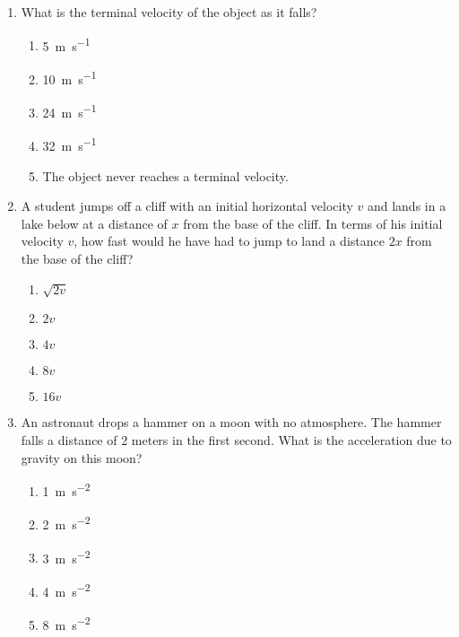 \documentclass{../../oss-apphys}
\begin{document}
\begin{multicols}{2}
\begin{enumerate}[resume,leftmargin=18pt]
  \item What is the terminal velocity of the object as it falls?
    \begin{enumerate}[noitemsep,topsep=0pt,leftmargin=18pt,label=(\Alph*)]
    \item \SI{5 }{\metre\per\second}
    \item \SI{10}{\metre\per\second}
    \item \SI{24}{\metre\per\second}
    \item \SI{32}{\metre\per\second}
    \item The object never reaches a terminal velocity.
    \end{enumerate}
  
  \item A student jumps off a cliff with an initial horizontal velocity $v$ and
    lands in a lake below at a distance of $x$ from the base of the cliff. In
    terms of his initial velocity $v$, how fast would he have had to jump to
    land a distance $2x$ from the base of the cliff?
    \begin{center}
    \end{center}
    \begin{enumerate}[noitemsep,topsep=0pt,leftmargin=18pt,label=(\Alph*)]
    \item $\sqrt{2v}$
    \item $2v$
    \item $4v$
    \item $8v$
    \item $16v$
    \end{enumerate}
    \columnbreak
    
  \item An astronaut drops a hammer on a moon with no atmosphere. The hammer
    falls a distance of $2$ meters in the first second. What is the
    acceleration due to gravity on this moon?
    \begin{enumerate}[noitemsep,topsep=0pt,leftmargin=18pt,label=(\Alph*)]
    \item\SI{1}{\metre\per\second^2}
    \item\SI{2}{\metre\per\second^2}
    \item\SI{3}{\metre\per\second^2}
    \item\SI{4}{\metre\per\second^2}
    \item\SI{8}{\metre\per\second^2}
    \end{enumerate}


\end{enumerate}
\end{multicols}
\end{document}

